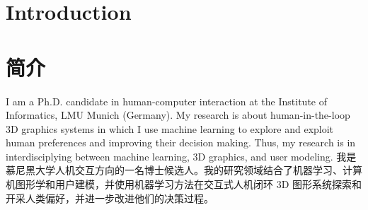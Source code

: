  {
\section{\textbf{Introduction}}
}{
\section{\textbf{简介}}
}
 {
\small
I am a Ph.D. candidate in human-computer interaction at the Institute of Informatics, LMU Munich (Germany). My research is about human-in-the-loop 3D graphics systems in which I use machine learning to explore and exploit human preferences and improving their decision making. Thus, my research is in interdisciplying between machine learning, 3D graphics, and user modeling.
}{
\small
我是慕尼黑大学人机交互方向的一名博士候选人。我的研究领域结合了机器学习、计算机图形学和用户建模，并使用机器学习方法在交互式人机闭环 3D 图形系统探索和开采人类偏好，并进一步改进他们的决策过程。
}